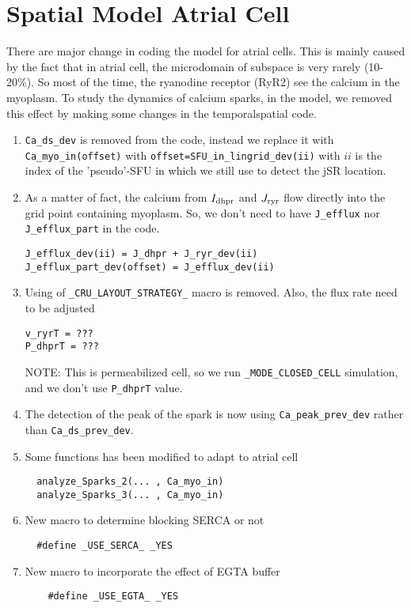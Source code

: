 \chapter{Spatial Model Atrial Cell}
\label{chap:spatial_atrial_cell}


There are major change in coding the model for atrial cells. This is mainly
caused by the fact that in atrial cell, the microdomain of subspace is very
rarely (10-20\%). So most of the time, the ryanodine receptor (RyR2) see the calcium in the myoplasm. 
To study the dynamics of calcium sparks, in the model, we removed this effect by
making some changes in the temporalspatial code.

\begin{enumerate}
  \item  \verb!Ca_ds_dev! is removed from the code, instead we replace it with
  \verb!Ca_myo_in(offset)! with \verb!offset=SFU_in_lingrid_dev(ii)! with $ii$
  is the index of the 'pseudo'-SFU in which we still use to detect the jSR location. 
 
 \item As a matter of fact, the calcium from $I_{\text{dhpr}}$ and $J_{\text{ryr}}$ flow directly into
the grid point containing myoplasm. So, we don't need to have
\verb!J_efflux! nor \verb!J_efflux_part! in the code.

\begin{verbatim}
J_efflux_dev(ii) = J_dhpr + J_ryr_dev(ii)
J_efflux_part_dev(offset) = J_efflux_dev(ii)
\end{verbatim}

 \item Using of \verb!_CRU_LAYOUT_STRATEGY_! macro is removed. Also, the flux
 rate need to be adjusted
\begin{verbatim}
v_ryrT = ???
P_dhprT = ???
\end{verbatim}
NOTE: This is permeabilized cell, so we run \verb!_MODE_CLOSED_CELL! simulation,
and we don't use \verb!P_dhprT! value.

  \item The detection of the peak of the spark is now using
  \verb!Ca_peak_prev_dev! rather than \verb!Ca_ds_prev_dev!. 
  
  \item Some functions has been modified to adapt to atrial cell
  \begin{verbatim}
  analyze_Sparks_2(... , Ca_myo_in)
  analyze_Sparks_3(... , Ca_myo_in)
  \end{verbatim}
  
  \item New macro to determine blocking SERCA or not
  \begin{verbatim}
  #define _USE_SERCA_ _YES
  \end{verbatim}
  
  \item New macro to incorporate the effect of EGTA buffer
  \begin{verbatim}
    #define _USE_EGTA_ _YES
  \end{verbatim}
\end{enumerate}

